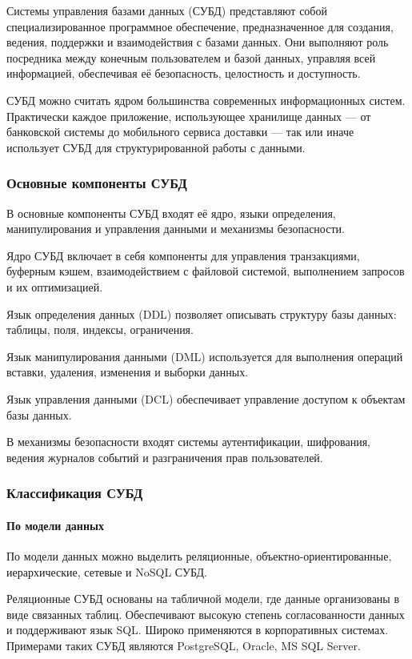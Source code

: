 Системы управления базами данных (СУБД) представляют собой специализированное программное обеспечение, предназначенное для создания, ведения, поддержки и взаимодействия с базами данных. Они выполняют роль посредника между конечным пользователем и базой данных, управляя всей информацией, обеспечивая её безопасность, целостность и доступность.

СУБД можно считать ядром большинства современных информационных систем. Практически каждое приложение, использующее хранилище данных — от банковской системы до мобильного сервиса доставки — так или иначе использует СУБД для структурированной работы с данными.

\subsubsection{Основные компоненты СУБД}

В основные компоненты СУБД входят её ядро, языки определения, манипулирования и управления данными и механизмы безопасности.

Ядро СУБД включает в себя компоненты для управления транзакциями, буферным кэшем, взаимодействием с файловой системой, выполнением запросов и их оптимизацией.

Язык определения данных (DDL) позволяет описывать структуру базы данных: таблицы, поля, индексы, ограничения.
	
Язык манипулирования данными (DML) используется для выполнения операций вставки, удаления, изменения и выборки данных.
	
Язык управления данными (DCL) обеспечивает управление доступом к объектам базы данных.
	
В механизмы безопасности входят системы аутентификации, шифрования, ведения журналов событий и разграничения прав пользователей.

\subsubsection{Классификация СУБД}

\paragraph{По модели данных}

По модели данных можно выделить реляционные, объектно-ориентированные, иерархические, сетевые и NoSQL СУБД.

Реляционные СУБД основаны на табличной модели, где данные организованы в виде связанных таблиц. Обеспечивают высокую степень согласованности данных и поддерживают язык SQL. Широко применяются в корпоративных системах. Примерами таких СУБД являются PostgreSQL, Oracle, MS SQL Server.


